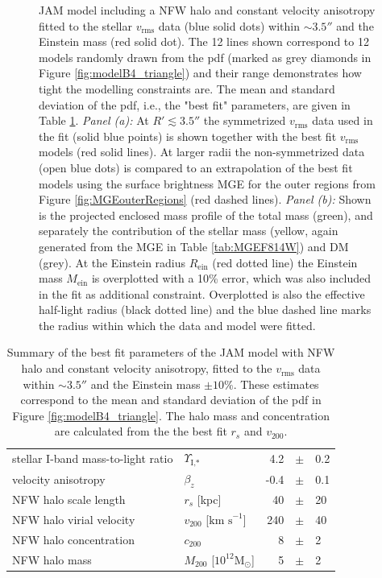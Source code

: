\documentclass[useAMS,usenatbib]{mnras}
\begin{document}
\begin{figure}
\begin{subfigure}{.48\textwidth}
  \label{fig:modelB4_enclMass}
\end{subfigure}
\caption{JAM model including a NFW halo and constant velocity anisotropy fitted to the stellar $v_\text{rms}$ data (blue solid dots) within $\sim3.5''$ and the Einstein mass (red solid dot). The 12 lines shown correspond to 12 models randomly drawn from the pdf (marked as grey diamonds in Figure \ref{fig:modelB4_triangle}) and their range demonstrates how tight the modelling constraints are. The mean and standard deviation of the pdf, i.e., the "best fit" parameters, are given in Table \ref{tab:modelB4_bestfit}. \emph{Panel (a):} At $R'\lesssim 3.5''$ the symmetrized $v_\text{rms}$ data used in the fit (solid blue points) is shown together with the best fit $v_\text{rms}$ models (red solid lines). At larger radii the non-symmetrized data (open blue dots) is compared to an extrapolation of the best fit models using the surface brightness MGE for the outer regions from Figure \ref{fig:MGEouterRegions} (red dashed lines). \emph{Panel (b):} Shown is the projected enclosed mass profile of the total mass (green), and separately the contribution of the stellar mass (yellow, again generated from the MGE in Table \ref{tab:MGEF814W}) and DM (grey). At the Einstein radius $R_\text{ein}$ (red dotted line) the Einstein mass $M_\text{ein}$ is overplotted with a 10\% error, which was also included in the fit as additional constraint. Overplotted is also the effective half-light radius (black dotted line) and the blue dashed line marks the radius within which the data and model were fitted.}
\label{fig:modelB4_models}
\end{figure}

\begin{table}
\centering
\begin{tabular}{llrcl}
\hline
stellar I-band mass-to-light ratio & $\Upsilon_\text{I,*}$ & 4.2 & $\pm$ & 0.2\\
velocity anisotropy & $\beta_z$ & -0.4 & $\pm$ & 0.1 \\
NFW halo scale length & $r_s$ [kpc] & 40 & $\pm$ & 20\\
NFW halo virial velocity & $v_{200}$ [$\text{km s}^{-1}$] & 240 & $\pm$ & 40\\
NFW halo concentration & $c_{200}$ & 8 & $\pm$ & 2 \\
NFW halo mass & $M_{200}$ [$10^{12} \text{M}_\odot$] & 5 & $\pm$ & 2\\
\hline
\end{tabular}
\caption{Summary of the best fit parameters of the JAM model with NFW halo and constant velocity anisotropy, fitted to the $v_\text{rms}$ data within $\sim 3.5''$ and the Einstein mass $\pm10\%$. These estimates correspond to the mean and standard deviation of the pdf in Figure \ref{fig:modelB4_triangle}. The halo mass and concentration are calculated from the the best fit $r_s$ and $v_{200}$.}
\label{tab:modelB4_bestfit}
\end{table}
\end{document}
